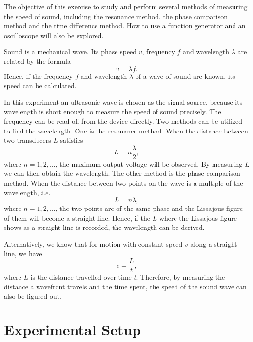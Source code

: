 \documentclass[a4paper]{article}
\begin{document}
The objective of this exercise to study and perform several methods of measuring the speed of sound, including the resonance method, the phase comparison method and the time difference method. How to use a function generator and an oscilloscope will also be explored.

Sound is a mechanical wave. Its phase speed $v$, frequency $f$ and wavelength $\lambda$ are related by the formula
\begin{equation}\label{Eq:vlambdaf}
v = \lambda f.
\end{equation}
Hence, if the frequency $f$ and wavelength $\lambda$ of a wave of sound are known, its speed can be calculated.

In this experiment an ultrasonic wave is chosen as the signal source, because its wavelength is short enough to measure the speed of sound precisely. The frequency can be read off from the device directly. Two methods can be utilized to find the wavelength. One is the resonance method. When the distance between two transducers $L$ satisfies
\begin{equation}\label{Eq:reasonance}
L = n \frac{\lambda}{2},
\end{equation}
where $n = 1,2,\dots$, the maximum output voltage will be observed. By measuring $L$ we can then obtain the wavelength. The other method is the phase-comparison method. When the distance between two points on the wave is a multiple of the wavelength, $i.e.$
\begin{equation}\label{Eq:phase}
L = n \lambda,
\end{equation}
where $n = 1,2,\dots$, the two points are of the same phase and the Lissajous figure of them will become a straight line. Hence, if the $L$ where the Lissajous figure shows as a straight line is recorded, the wavelength can be derived.

Alternatively, we know that for motion with constant speed $v$ along a straight line, we have
\begin{equation}\label{Eq:vLt}
v = \frac{L}{t},
\end{equation}
where $L$ is the distance travelled over time $t$. Therefore, by measuring the distance a wavefront travels and the time spent, the speed of the sound wave can also be figured out.



\section{Experimental Setup}
\end{document}
